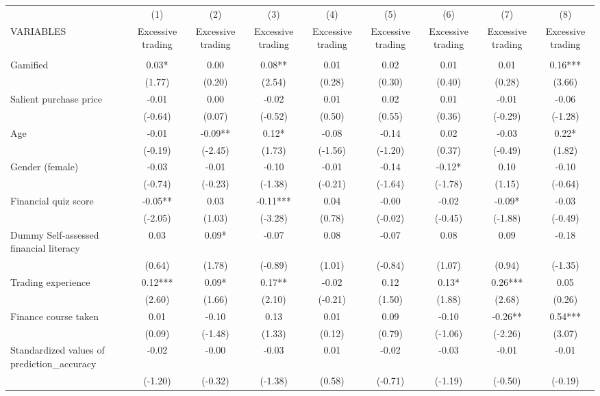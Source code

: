 \documentclass[]{article}
\begin{document}
\begin{tabular}{lcccccccc} \hline
 & (1) & (2) & (3) & (4) & (5) & (6) & (7) & (8) \\
VARIABLES & Excessive trading & Excessive trading & Excessive trading & Excessive trading & Excessive trading & Excessive trading & Excessive trading & Excessive trading \\ \hline
 &  &  &  &  &  &  &  &  \\
Gamified & 0.03* & 0.00 & 0.08** & 0.01 & 0.02 & 0.01 & 0.01 & 0.16*** \\
 & (1.77) & (0.20) & (2.54) & (0.28) & (0.30) & (0.40) & (0.28) & (3.66) \\
Salient purchase price & -0.01 & 0.00 & -0.02 & 0.01 & 0.02 & 0.01 & -0.01 & -0.06 \\
 & (-0.64) & (0.07) & (-0.52) & (0.50) & (0.55) & (0.36) & (-0.29) & (-1.28) \\
Age & -0.01 & -0.09** & 0.12* & -0.08 & -0.14 & 0.02 & -0.03 & 0.22* \\
 & (-0.19) & (-2.45) & (1.73) & (-1.56) & (-1.20) & (0.37) & (-0.49) & (1.82) \\
Gender (female) & -0.03 & -0.01 & -0.10 & -0.01 & -0.14 & -0.12* & 0.10 & -0.10 \\
 & (-0.74) & (-0.23) & (-1.38) & (-0.21) & (-1.64) & (-1.78) & (1.15) & (-0.64) \\
Financial quiz score & -0.05** & 0.03 & -0.11*** & 0.04 & -0.00 & -0.02 & -0.09* & -0.03 \\
 & (-2.05) & (1.03) & (-3.28) & (0.78) & (-0.02) & (-0.45) & (-1.88) & (-0.49) \\
Dummy Self-assessed financial literacy & 0.03 & 0.09* & -0.07 & 0.08 & -0.07 & 0.08 & 0.09 & -0.18 \\
 & (0.64) & (1.78) & (-0.89) & (1.01) & (-0.84) & (1.07) & (0.94) & (-1.35) \\
Trading experience & 0.12*** & 0.09* & 0.17** & -0.02 & 0.12 & 0.13* & 0.26*** & 0.05 \\
 & (2.60) & (1.66) & (2.10) & (-0.21) & (1.50) & (1.88) & (2.68) & (0.26) \\
Finance course taken & 0.01 & -0.10 & 0.13 & 0.01 & 0.09 & -0.10 & -0.26** & 0.54*** \\
 & (0.09) & (-1.48) & (1.33) & (0.12) & (0.79) & (-1.06) & (-2.26) & (3.07) \\
Standardized values of prediction\_accuracy & -0.02 & -0.00 & -0.03 & 0.01 & -0.02 & -0.03 & -0.01 & -0.01 \\
 & (-1.20) & (-0.32) & (-1.38) & (0.58) & (-0.71) & (-1.19) & (-0.50) & (-0.19) \\

\end{tabular}
\end{document}
